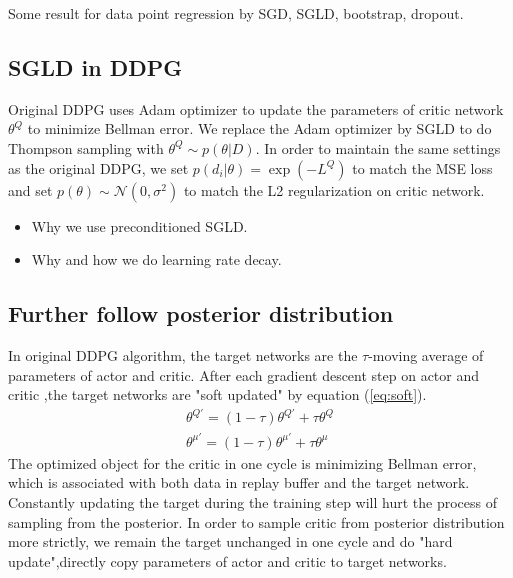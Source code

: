 Some result for data point regression by SGD, SGLD, bootstrap, dropout.
 
\subsection{SGLD in DDPG}
Original DDPG uses Adam optimizer to update the parameters of critic network $\theta^Q$ to minimize Bellman error. We replace the Adam optimizer by SGLD to do Thompson sampling with $\theta^Q \sim p(\theta | D)$. In order to maintain the same settings as the original DDPG, we set $p(d_i|\theta)=\exp(-L^Q)$ to match the MSE loss and set $p(\theta)\sim\mathcal{N}(0,\sigma^2)$ to match the L2 regularization on critic network.
\begin{itemize}
\item Why we use preconditioned SGLD.
\item Why and how we do learning rate decay.
\end{itemize}

\subsection{Further follow posterior distribution}
In original DDPG algorithm, the target networks are the $\tau$-moving average of parameters of actor and critic. After each gradient descent step on actor and critic ,the target networks are "soft updated" by equation (\ref{eq:soft}).
\begin{equation}
\label{eq:soft} 
\begin{aligned}
\theta^{Q'} = (1-\tau)\theta^{Q'}+\tau\theta^Q\\
\theta^{\mu'} = (1-\tau)\theta^{\mu'}+\tau\theta^\mu
\end{aligned}
\end{equation}
The optimized object for the critic in one cycle is minimizing Bellman error, which is associated with both data in replay buffer and the target network. Constantly updating the target during the training step will hurt the process of sampling from the posterior. In order to sample critic from posterior distribution more strictly, we remain the target unchanged in one cycle and do "hard update",directly copy parameters of actor and critic to target networks.